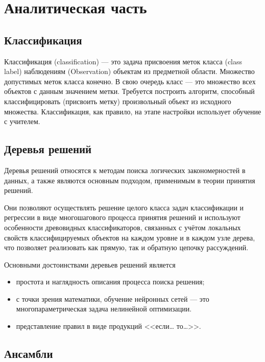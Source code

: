 \chapter{Аналитическая часть}

\section{Классификация}

Классификация (classification) — это задача присвоения меток класса
(class label) наблюдениям (Observation) объектам из предметной области.
Множество допустимых меток класса конечно. В свою очередь класс —
это множество всех объектов с данным значением метки. Требуется
построить алгоритм, способный классифицировать (присвоить метку)
произвольный объект из исходного множества. Классификация, как
правило, на этапе настройки использует обучение с учителем.

\section{Деревья решений}

Деревья решений относятся к методам поиска логических
закономерностей в данных, а также являются основным подходом,
применимым в теории принятия решений.

Они позволяют осуществлять решение целого класса задач
классификации и регрессии в виде многошагового процесса принятия
решений и используют особенности древовидных классификаторов,
связанных с учётом локальных свойств классифицируемых объектов на
каждом уровне и в каждом узле дерева, что позволяет реализовать как
прямую, так и обратную цепочку рассуждений.

Основными достоинствами деревьев
решений является

\begin{itemize}[label*=---]
	\item простота и наглядность описания
	процесса поиска решения;
	\item с точки зрения математики, обучение нейронных сетей --- это
	многопараметрическая задача нелинейной оптимизации.
	\item представление правил в виде
	продукций <<если… то…>>.
\end{itemize}

\section{Ансамбли}

